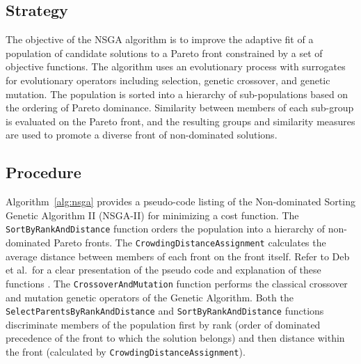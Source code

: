 \subsection{Strategy}
The objective of the NSGA algorithm is to improve the adaptive fit of a population of candidate solutions to a Pareto front constrained by a set of objective functions.
The algorithm uses an evolutionary process with surrogates for evolutionary operators including selection, genetic crossover, and genetic mutation. 
The population is sorted into a hierarchy of sub-populations based on the ordering of Pareto dominance. Similarity between members of each sub-group is evaluated on the Pareto front, and the resulting groups and similarity measures are used to promote a diverse front of non-dominated solutions.

\subsection{Procedure}
Algorithm~\ref{alg:nsga} provides a pseudo-code listing of the Non-dominated Sorting Genetic Algorithm II (NSGA-II) for minimizing a cost function. 
The \texttt{SortByRankAndDistance} function orders the population into a hierarchy of non-dominated Pareto fronts. The \texttt{CrowdingDistanceAssignment} calculates the average distance between members of each front on the front itself. Refer to Deb et al.\ for a clear presentation of the pseudo code and explanation of these functions \cite{Deb2002}. The \texttt{CrossoverAndMutation} function performs the classical crossover and mutation genetic operators of the Genetic Algorithm. Both the \texttt{SelectParentsByRankAndDistance} and \texttt{SortByRankAndDistance} functions discriminate members of the population first by rank (order of dominated precedence of the front to which the solution belongs) and then distance within the front (calculated by \texttt{CrowdingDistanceAssignment}).


